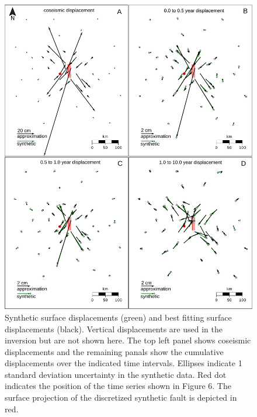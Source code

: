\documentclass[extra,mreferee]{gji}
\begin{document}
\begin{figure}\label{figure5}
  \centering
  \includegraphics[scale=0.6]{FinalFigures/Figure4.pdf}
  \caption{Synthetic surface displacements (green) and best fitting
    surface displacements (black).  Vertical displacements are used in
    the inversion but are not shown here.  The top left panel shows
    coseismic displacements and the remaining panals show the
    cumulative displacements over the indicated time
    intervals. Ellipses indicate 1 standard deviation uncertainty in
    the synthetic data. Red dot indicates the position of the time
    series shown in Figure 6. The surface projection of the
    discretized synthetic fault is depicted in red.}
  \label{Figure 5}
\end{figure}
\end{document}
